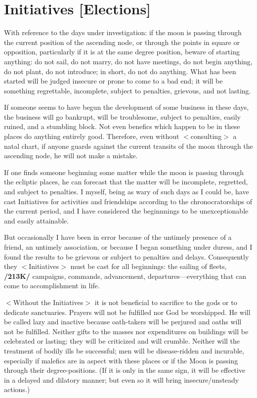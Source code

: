 \section{Initiatives [Elections]}

With reference to the days under investigation: if the moon is passing through the current position of the ascending node, or through the points in square or opposition, particularly if it is at the same degree position, beware of starting anything: do not sail, do not marry, do not have meetings, do not begin anything, do not plant, do not introduce; in short, do not do anything. What has been started will be judged insecure or prone to come to a bad end; it will be something regrettable, incomplete, subject to penalties, grievous, and not lasting.
 
 If someone seems to have begun the development of some business in these days, the business will go bankrupt, will be troublesome, subject to penalties, easily ruined, and a stumbling block. Not even benefics which happen to be in these places do anything entirely good.
Therefore, even without $<$consulting$>$ a natal chart, if anyone guards against the current transits of the moon through the ascending node, he will not make a mistake.

If one finds someone beginning some matter while the moon is passing through the ecliptic places, he can forecast that the matter will be incomplete, regretted, and subject to penalties. I myself, being as wary of such days as I could be, have cast Initiatives for activities and friendships according to the chronocratorships of the current period, and I have considered the beginnnings to be unexceptionable and easily attainable. 

But occasionally I have been in error because of the untimely presence of a friend, an untimely association, or because I began something under duress, and I found the results to be grievous or subject to
penalties and delays. Consequently they $<$Initiatives$>$ must be cast for all beginnings: the sailing of fleets, \textbf{/213K/} campaigns, commands, advancement, departures—everything that can come to accomplishment in life. 

$<$Without the Initiatives$>$ it is not beneficial to sacrifice to the gods or to dedicate sanctuaries.  Prayers will not be fulfilled nor God be worshipped. He will be called lazy and inactive because oath-takers
will be perjured and oaths will not be fulfilled. Neither gifts to the masses nor expenditures on buildings will be celebrated or lasting; they will be criticized and will crumble. Neither will the treatment of bodily
ills be successful; men will be disease-ridden and incurable, especially if malefics are in aspect with these places or if the Moon is passing through their degree-positions. (If it is only in the same sign, it will be
effective in a delayed and dilatory manner; but even so it will bring insecure/unsteady actions.)

\newpage